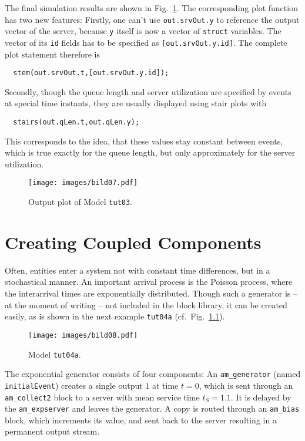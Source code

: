 \documentclass[12pt,oneside,a4paper,bibtotoc,BCOR=0pt,DIV=20]{scrreprt}
\newcommand{\cft}[1]{\mbox{\texttt{#1}}}   %
\begin{document}
The final simulation results are shown in Fig.\ \ref{fig_7}. The corresponding
plot function has two new features: Firstly, one can't use \cft{out.srvOut.y}
to reference the output vector of the server, because \cft{y} itself is now a
vector of \cft{struct} variables. The vector of its \cft{id} fields has to be
specified as \cft{[out.srvOut.y.id]}. The complete plot statement therefore is
\begin{verbatim}
  stem(out.srvOut.t,[out.srvOut.y.id]);
\end{verbatim}
Secondly, though the queue length and server utilization are specified by
events at special time instants, they are usually displayed using stair plots
with
\begin{verbatim}
  stairs(out.qLen.t,out.qLen.y);
\end{verbatim}
This corresponds to the idea, that these values stay constant between events,
which is true exactly for the queue length, but only approximately for the
server utilization.

\begin{figure}[ht]
\centering
\texttt{[image: images/bild07.pdf]}
\caption{Output plot of Model \cft{tut03}.}
\label{fig_7}
\end{figure}


\chapter{Creating Coupled Components} \label{sec6}

Often, entities enter a system not with constant time differences, but in a
stochastical manner. An important arrival process is the Poisson process, where
the interarrival times are exponentially distributed. Though such a generator
is -- at the moment of writing -- not included in the block library, it can be
created easily, as is shown in the next example \cft{tut04a}
(cf.\ Fig.\ \ref{fig_8}).

\begin{figure}[ht]
\centering
\texttt{[image: images/bild08.pdf]}
\caption{Model \cft{tut04a}.}
\label{fig_8}
\end{figure}

The exponential generator consists of four components: An \cft{am\_generator}
(named \cft{initialEvent}) creates a single output $1$ at time $t = 0$, which
is sent through an \cft{am\_collect2} block to a server with mean service time
$t_S = 1.1$. It is delayed by the \cft{am\_expserver} and leaves the
generator. A copy is routed through an \cft{am\_bias} block, which increments
its value, and sent back to the server resulting in a permanent output stream.
\end{document}
